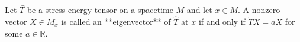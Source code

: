 Let $\hat{T}$ be a stress-energy tensor on a spacetime $M$ and let $x \in M$. A nonzero vector $X \in M_x$ is called an **eigenvector** of $\hat{T}$ at $x$ if and only if $\tilde{T}X = aX$ for some $a \in \mathbb{R}$.
